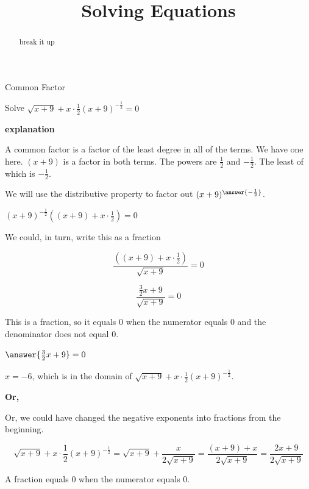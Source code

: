 \documentclass{ximera}
\title{Solving Equations}
\begin{document}
\begin{abstract}
break it up
\end{abstract}
\maketitle





\begin{example}  Common Factor


Solve $\sqrt{x+9} + x \cdot \frac{1}{2} (x+9)^{-\tfrac{1}{2}} = 0$



\textbf{\textcolor{red!75!green}{explanation}} 



A common factor is a factor of the least degree in all of the terms.  We have one here. $(x+9)$ is a factor in both terms.  The powers are $\frac{1}{2}$ and $-\frac{1}{2}$. The least of which is $-\frac{1}{2}$.

We will use the distributive property to factor out $(x+9)^{\answer{-\frac{1}{2}}}$.


$(x+9)^{-\tfrac{1}{2}} \left((x+9) + x \cdot \frac{1}{2}\right)  = 0$


We could, in turn, write this as a fraction


\[  \frac{\left((x+9) + x \cdot \frac{1}{2}\right)}{\sqrt{x+9}} = 0 \]


\[  \frac{ \frac{3}{2} x + 9}{\sqrt{x+9}} = 0 \]



This is a fraction, so it equals $0$ when the numerator equals $0$ and the denominator does not equal $0$.


$\answer{\frac{3}{2} x + 9} = 0$



$x = -6$, which is in the domain of $\sqrt{x+9} + x \cdot \frac{1}{2} (x+9)^{-\tfrac{1}{2}}$.


\textbf{\textcolor{blue!55!black}{Or,}}


Or, we could have changed the negative exponents into fractions from the beginning.


  \[
\sqrt{x+9} + x \cdot \frac{1}{2} (x+9)^{-\tfrac{1}{2}} = \sqrt{x+9} + \frac{x}{2 \sqrt{x+9}} = \frac{(x+9)+x}{2 \sqrt{x+9}} = \frac{2x+9}{2 \sqrt{x+9}}
  \]



A fraction equals $0$ when the numerator equals $0$.



\end{example}
\end{document}
